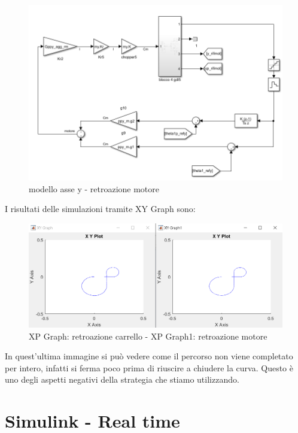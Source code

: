 \documentclass{article}
\begin{document}
\begin{figure}[H]
\centering
\includegraphics[width=.9\textwidth]{./strategia_sim/pospolmoty.png}
\caption{ modello asse y - retroazione motore}
\end{figure}

I risultati delle simulazioni tramite XY Graph sono:

\begin{figure}[H]
\centering
\includegraphics[width=.9\textwidth]{./strategia_sim/pospoldis.png}
\caption{   XP Graph: retroazione carrello -
            XP Graph1: retroazione motore }
\end{figure}
In quest'ultima immagine si può vedere come il percorso non viene completato per intero, infatti si ferma poco prima di riuscire a chiudere la curva. Questo è uno degli aspetti negativi della strategia che stiamo utilizzando. 

\section{Simulink - Real time}
\end{document}
